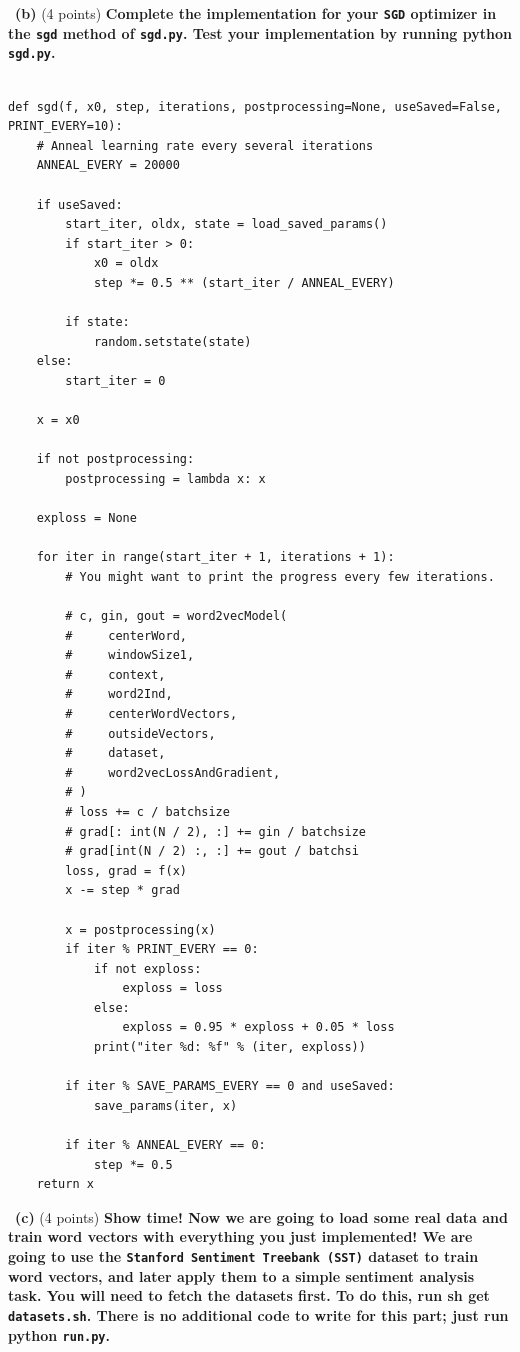 \documentclass[a4 paper]{article}
\newcommand{\subproblem}[1]{~\newline\textbf{(#1)}}
\begin{document}
\subproblem{b} (4 points) \textbf{Complete the implementation for your \texttt{SGD} optimizer in the \texttt{sgd} method of \texttt{sgd.py}.
Test your implementation by running python \texttt{sgd.py}.}

\begin{lstlisting}[label={list:first},caption=sgd.py function.]

def sgd(f, x0, step, iterations, postprocessing=None, useSaved=False, PRINT_EVERY=10):
    # Anneal learning rate every several iterations
    ANNEAL_EVERY = 20000

    if useSaved:
        start_iter, oldx, state = load_saved_params()
        if start_iter > 0:
            x0 = oldx
            step *= 0.5 ** (start_iter / ANNEAL_EVERY)

        if state:
            random.setstate(state)
    else:
        start_iter = 0

    x = x0

    if not postprocessing:
        postprocessing = lambda x: x

    exploss = None

    for iter in range(start_iter + 1, iterations + 1):
        # You might want to print the progress every few iterations.

        # c, gin, gout = word2vecModel(
        #     centerWord,
        #     windowSize1,
        #     context,
        #     word2Ind,
        #     centerWordVectors,
        #     outsideVectors,
        #     dataset,
        #     word2vecLossAndGradient,
        # )
        # loss += c / batchsize
        # grad[: int(N / 2), :] += gin / batchsize
        # grad[int(N / 2) :, :] += gout / batchsi
        loss, grad = f(x)
        x -= step * grad

        x = postprocessing(x)
        if iter % PRINT_EVERY == 0:
            if not exploss:
                exploss = loss
            else:
                exploss = 0.95 * exploss + 0.05 * loss
            print("iter %d: %f" % (iter, exploss))

        if iter % SAVE_PARAMS_EVERY == 0 and useSaved:
            save_params(iter, x)

        if iter % ANNEAL_EVERY == 0:
            step *= 0.5
    return x
\end{lstlisting}

\subproblem{c} (4 points) \textbf{Show time! Now we are going to load some real data and train word vectors with everything you just implemented!
We are going to use the \texttt{Stanford Sentiment Treebank (SST)} dataset to train word
vectors, and later apply them to a simple sentiment analysis task.
You will need to fetch the datasets first.
To do this, run sh get \texttt{datasets.sh}.
There is no additional code to write for this part; just run python \texttt{run.py}.}
\end{document}
